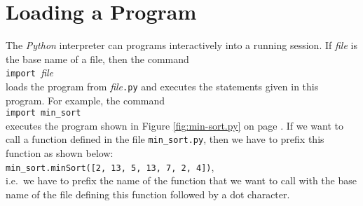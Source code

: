 \section{Loading a Program}
The \textsl{Python} interpreter can  programs interactively into a running session.
If \textsl{file} is the base name of a file, then the command
\\[0.2cm]
\hspace*{1.3cm}
\texttt{import }\textsl{file}
\\[0.2cm]
loads the program from  \textsl{file}\texttt{.py} and executes the statements given in this program.
For example, the command
\\[0.2cm]
\hspace*{1.3cm}
\texttt{import min\_sort}
\\[0.2cm]
executes the program shown in Figure
\ref{fig:min-sort.py} on page \pageref{fig:min-sort.py}.  If we want to call a function defined in the file
\texttt{min\_sort.py},  then we have to prefix this function as shown below:
\\[0.2cm]
\hspace*{1.3cm}
\texttt{min\_sort.minSort([2, 13, 5, 13, 7, 2, 4])},
\\[0.2cm]
i.e.~we have to prefix the name of the function that we want to call with the base name of the file defining
this function followed by a dot character.

